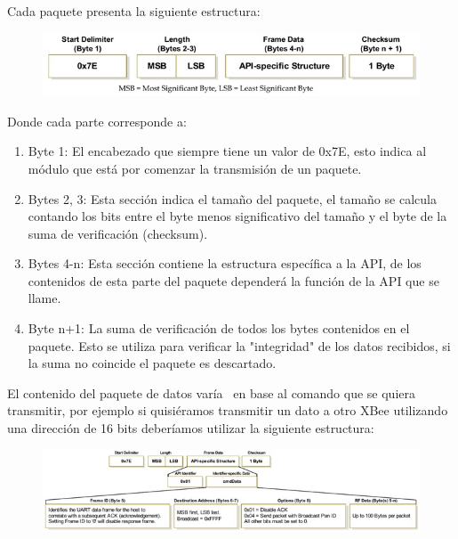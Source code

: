 \documentclass[11pt,oneside,spanish,a4paper]{article}
\begin{document}
Cada paquete presenta la siguiente estructura:
\begin{figure}[ht]
	\centering
	\includegraphics[width=.6\textwidth]{img/IMAGEN05.jpg}
\end{figure}
Donde cada parte corresponde a:
\begin{enumerate}[1.]
	\item Byte 1: El encabezado que siempre tiene un valor de 0x7E, esto indica al módulo que está por comenzar la transmisión de un paquete.
	\item Bytes 2, 3: Esta sección indica el tamaño del paquete, el tamaño se calcula contando los bits entre el byte menos significativo del tamaño y el byte de la suma de verificación (checksum).
	\item Bytes 4-n: Esta sección contiene la estructura específica a la API, de los contenidos de esta parte del paquete dependerá la función de la API que se llame.
	\item Byte n+1: La suma de verificación de todos los bytes contenidos en el paquete. Esto se utiliza para verificar la "integridad" de los datos recibidos, si la suma no coincide el paquete es descartado.
\end{enumerate}

El contenido del paquete de datos varía  en base al comando que se quiera transmitir, por ejemplo si quisiéramos transmitir un dato a otro XBee utilizando una dirección de 16 bits deberíamos utilizar la siguiente estructura:
\begin{figure}[ht]
	\centering
	\includegraphics[width=.6\textwidth]{img/IMAGEN06.jpg}
\end{figure}
\end{document}
